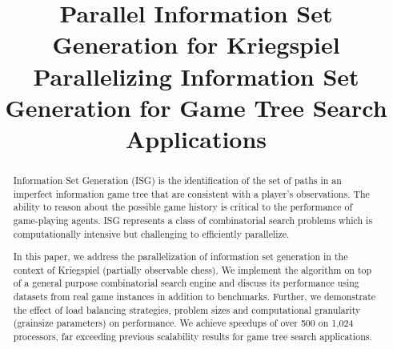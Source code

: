 \documentclass[10pt, conference, compsocconf]{IEEEtran}
\begin{document}
\title{Parallel Information Set Generation for Kriegspiel 
       }
\title{Parallelizing  Information Set Generation for Game Tree Search Applications} 

\author{
}

\maketitle
\thispagestyle{empty}



\begin{abstract}
Information Set Generation (ISG) is the identification of the set of paths in an
imperfect information game tree that are consistent with a player's
observations.  The ability to reason about the possible game history is
critical to the performance of game-playing agents.  ISG represents a class of
combinatorial search problems which is computationally intensive but challenging
to efficiently parallelize.

In this paper, we address the parallelization of information set generation in
the context of Kriegspiel (partially observable chess).  We implement the
algorithm on top of a general purpose combinatorial search engine and discuss
its performance using datasets from real game instances in addition to benchmarks. Further, we demonstrate the effect of load balancing strategies, problem sizes and computational granularity (grainsize parameters) on performance.  We achieve speedups of over 500 on 1,024 processors, far
exceeding previous scalability results for game tree search applications.
\end{abstract}
\end{document}
